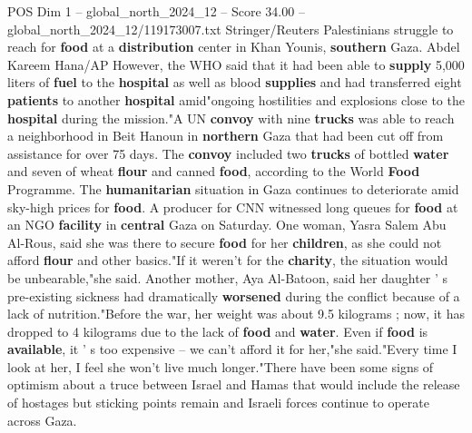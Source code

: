 \begin{textsample}{POS Dim 1 – global\_north\_2024\_12 – Score 34.00 – global\_north\_2024\_12/119173007.txt}
Stringer/Reuters Palestinians struggle to reach for \textbf{food} at a \textbf{distribution} center in Khan Younis, \textbf{southern} Gaza.
Abdel Kareem Hana/AP However, the WHO said that it had been able to \textbf{supply} 5,000 liters of \textbf{fuel} to the \textbf{hospital} as well as blood \textbf{supplies} and had transferred eight \textbf{patients} to another \textbf{hospital} amid"ongoing hostilities and explosions close to the \textbf{hospital} during the mission."A UN \textbf{convoy} with nine \textbf{trucks} was able to reach a neighborhood in Beit Hanoun in \textbf{northern} Gaza that had been cut off from assistance for over 75 days.
The \textbf{convoy} included two \textbf{trucks} of bottled \textbf{water} and seven of wheat \textbf{flour} and canned \textbf{food}, according to the World \textbf{Food} Programme.
The \textbf{humanitarian} situation in Gaza continues to deteriorate amid sky-high prices for \textbf{food}.
A producer for CNN witnessed long queues for \textbf{food} at an NGO \textbf{facility} in \textbf{central} Gaza on Saturday.
One woman, Yasra Salem Abu Al-Rous, said she was there to secure \textbf{food} for her \textbf{children}, as she could not afford \textbf{flour} and other basics."If it weren't for the \textbf{charity}, the situation would be unbearable,"she said.
Another mother, Aya Al-Batoon, said her daughter ' s pre-existing sickness had dramatically \textbf{worsened} during the conflict because of a lack of nutrition."Before the war, her weight was about 9.5 kilograms ; now, it has dropped to 4 kilograms due to the lack of \textbf{food} and \textbf{water}.
Even if \textbf{food} is \textbf{available}, it ' s too expensive -- we can't afford it for her,"she said."Every time I look at her, I feel she won't live much longer."There have been some signs of optimism about a truce between Israel and Hamas that would include the release of hostages but sticking points remain and Israeli forces continue to operate across Gaza.

\end{textsample}
